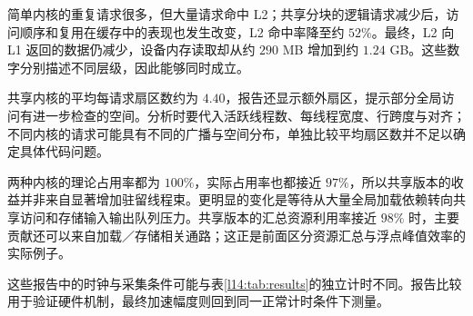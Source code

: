 简单内核的重复请求很多，但大量请求命中 L2；共享分块的逻辑请求减少后，访问顺序和复用在缓存中的表现也发生改变，L2 命中率降至约 $52\%$。最终，L2 向 L1 返回的数据仍减少，设备内存读取却从约 $290$ MB 增加到约 $1.24$ GB。这些数字分别描述不同层级，因此能够同时成立。

共享内核的平均每请求扇区数约为 $4.40$，报告还显示额外扇区，提示部分全局访问有进一步检查的空间。分析时要代入活跃线程数、每线程宽度、行跨度与对齐；不同内核的请求可能具有不同的广播与空间分布，单独比较平均扇区数并不足以确定具体代码问题。

两种内核的理论占用率都为 $100\%$，实际占用率也都接近 $97\%$，所以共享版本的收益并非来自显著增加驻留线程束。更明显的变化是等待从大量全局加载依赖转向共享访问和存储输入输出队列压力。共享版本的汇总资源利用率接近 $98\%$ 时，主要贡献还可以来自加载／存储相关通路；这正是前面区分资源汇总与浮点峰值效率的实际例子。

这些报告中的时钟与采集条件可能与表\ref{l14:tab:results}的独立计时不同。报告比较用于验证硬件机制，最终加速幅度则回到同一正常计时条件下测量。

